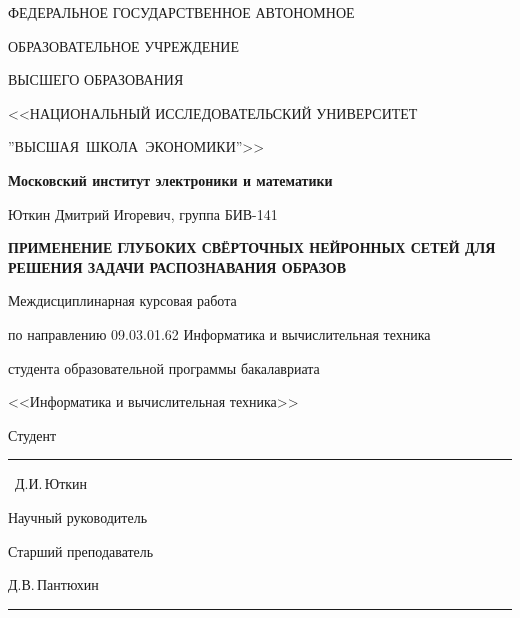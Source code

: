 \begin{titlepage}
    \begin{center}
        ФЕДЕРАЛЬНОЕ ГОСУДАРСТВЕННОЕ АВТОНОМНОЕ
        
        ОБРАЗОВАТЕЛЬНОЕ УЧРЕЖДЕНИЕ
        
        ВЫСШЕГО ОБРАЗОВАНИЯ
        
       <<НАЦИОНАЛЬНЫЙ ИССЛЕДОВАТЕЛЬСКИЙ УНИВЕРСИТЕТ
       
       ''ВЫСШАЯ~ШКОЛА~ЭКОНОМИКИ''>>
       \vspace{1cm}
 
        \textbf{Московский институт электроники и математики}
        
        Юткин Дмитрий Игоревич, группа БИВ-141
        \vspace{1cm}
        
        \textbf{\MakeUppercase{Применение глубоких свёрточных нейронных сетей для решения задачи распознавания образов}}
        \vspace{1cm}

        Междисциплинарная курсовая работа
        
        по направлению 09.03.01.62 Информатика и вычислительная техника 

        студента образовательной программы бакалавриата
        
        <<Информатика и вычислительная техника>>
        
    \end{center}
    \begin{flushright}
        Студент~\rule{4cm}{.1pt}~Д.И.\,Юткин
        \vspace{1cm}
        
        Научный руководитель

        Старший преподаватель

        Д.В.\,Пантюхин
        
        \rule{4cm}{.1pt}
    \end{flushright}
    \vfill{}
\end{titlepage}